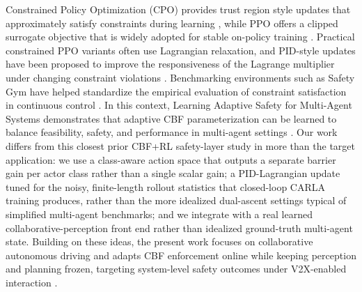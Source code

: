 Constrained Policy Optimization (CPO) provides trust region style updates that approximately satisfy constraints during learning \cite{achiam2017cpo}, while PPO offers a clipped surrogate objective that is widely adopted for stable on-policy training \cite{schulman2017ppo}. Practical constrained PPO variants often use Lagrangian relaxation, and PID-style updates have been proposed to improve the responsiveness of the Lagrange multiplier under changing constraint violations \cite{stooke2020pid}. Benchmarking environments such as Safety Gym have helped standardize the empirical evaluation of constraint satisfaction in continuous control \cite{ray2019safetygym}. In this context, Learning Adaptive Safety for Multi-Agent Systems demonstrates that adaptive CBF parameterization can be learned to balance feasibility, safety, and performance in multi-agent settings \cite{berducci2024las}. Our work differs from this closest prior CBF+RL safety-layer study in more than the target application: we use a class-aware action space that outputs a separate barrier gain per actor class rather than a single scalar gain; a PID-Lagrangian update tuned for the noisy, finite-length rollout statistics that closed-loop CARLA training produces, rather than the more idealized dual-ascent settings typical of simplified multi-agent benchmarks; and we integrate with a real learned collaborative-perception front end rather than idealized ground-truth multi-agent state. Building on these ideas, the present work focuses on collaborative autonomous driving and adapts CBF enforcement online while keeping perception and planning frozen, targeting system-level safety outcomes under V2X-enabled interaction \cite{liu2024v2xverse}.
